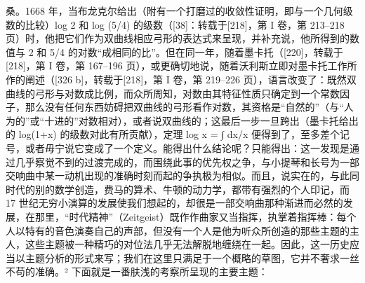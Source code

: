 桑。1668 年，当布龙克尔给出（附有一个打磨过的收敛性证明，即与一个几何级数的比较）log 2 和 log (5/4) 的级数（{[}38{]}：转载于{[}218{]}，第 I 卷，第 213–218 页）时，他把它们作为双曲线相应弓形的表达式来呈现，并补充说，他所得到的数值与 2 和 5/4 的对数“成相同的比”。但在同一年，随着墨卡托（{[}220{]}，转载于{[}218{]}，第 I 卷，第 167–196 页），或更确切地说，随着沃利斯立即对墨卡托工作所作的阐述（{[}326 b{]}，转载于{[}218{]}，第 I 卷，第 219–226 页），语言改变了：既然双曲线的弓形与对数成比例，而众所周知，对数由其特征性质只确定到一个常数因子，那么没有任何东西妨碍把双曲线的弓形看作对数，其资格是“自然的”（与“人为的”或“十进的”对数相对），或者说双曲线的；这最后一步一旦跨出（墨卡托给出的 log(1+x) 的级数对此有所贡献），定理 log x = ∫ dx/x 便得到了，至多差个记号，或者毋宁说它变成了一个定义。能得出什么结论呢？只能得出：这一发现是通过几乎察觉不到的过渡完成的，而围绕此事的优先权之争，与小提琴和长号为一部交响曲中某一动机出现的准确时刻而起的争执极为相似。而且，说实在的，与此同时代的别的数学创造，费马的算术、牛顿的动力学，都带有强烈的个人印记，而 17 世纪无穷小演算的发展使我们想起的，却很是一部交响曲那种渐进而必然的发展，在那里，“时代精神”（Zeitgeist）既作作曲家又当指挥，执掌着指挥棒：每个人以特有的音色演奏自己的声部，但没有一个人是他为听众所创造的那些主题的主人，这些主题被一种精巧的对位法几乎无法解脱地缠绕在一起。因此，这一历史应当以主题分析的形式来写；我们在这里只满足于一个概略的草图，它并不奢求一丝不苟的准确。² 下面就是一番肤浅的考察所呈现的主要主题：

